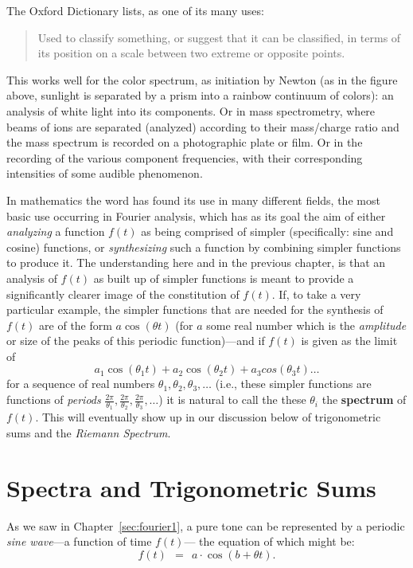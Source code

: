 \documentclass[openany]{book}
\theoremstyle{plain}
\theoremstyle{definition}
\begin{document}
{{  The Oxford Dictionary lists, as one of its many uses:

\begin{quote} Used to classify something, or suggest that it can be classified, in terms of its position on a scale between two extreme or opposite points.\end{quote}

This works well for the color spectrum, as initiation by Newton (as in the figure above, sunlight is separated by a prism into a rainbow  continuum of colors): an analysis of white light into its components. Or in mass spectrometry, where
 beams of ions are separated (analyzed) according to their
mass/charge ratio and the mass spectrum is recorded on a photographic plate or film.  Or in the recording of the various component frequencies, with their  corresponding intensities of some audible phenomenon.

 In mathematics the word  has found its use in many different fields, the most basic use occurring in Fourier analysis, which has as its goal the aim of either {\it analyzing}  a function $f(t)$ as being  comprised of simpler (specifically: sine and cosine) functions, or {\it synthesizing} such a function by combining simpler functions to produce it. The understanding here and in the previous chapter, is that  an analysis of $f(t)$ as built up of simpler functions is meant to provide a significantly clearer image of the constitution of $f(t)$.  If, to take a very particular example, the simpler functions  that are needed for the synthesis of $f(t)$ are of the form $a\cos(\theta t)$  (for $a$ some real number which is the {\it amplitude} or size of the peaks of this periodic function)---and  if $f(t)$ is given as the limit of $$a_1\cos(\theta_1t) +  a_2\cos(\theta_2t) + a_3cos(\theta_3t) \dots$$  for a sequence of real numbers $\theta_1, \theta_2,
 \theta_3,
 \dots$  (i.e., these simpler functions are functions of {\it periods} ${\frac{2\pi}{\theta_1}}, {\frac{2\pi}{\theta_2}}, {\frac{2\pi}{\theta_3}}, \dots$) it is natural to call the these $\theta_i$ the  {\bf spectrum} of $f(t)$.
   This will eventually show up in our discussion  below of trigonometric sums and the {\it Riemann Spectrum}.


 \chapter{Spectra and Trigonometric Sums \label{sec:trigsums}}

As we saw in Chapter~\ref{sec:fourier1}, a pure tone can be represented by a periodic {\it sine wave}---a function of  time $f(t)$--- the equation of which might be:
$$f(t)\ \ = \ \ a\cdot \cos(b +\theta t).$$

}}
\end{document}
